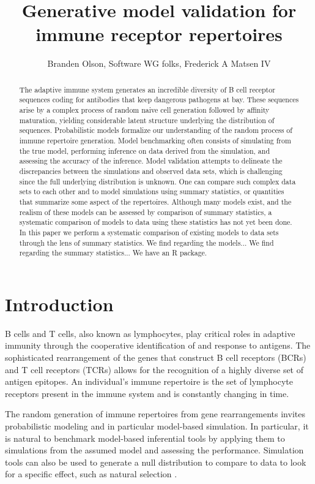 \documentclass{article}
\title{Generative model validation for immune receptor repertoires}
\author{Branden Olson, Software WG folks, Frederick A Matsen IV}
\begin{document}
\maketitle

\begin{abstract}
The adaptive immune system generates an incredible diversity of B cell receptor sequences coding for antibodies that keep dangerous pathogens at bay.
These sequences arise by a complex process of random naive cell generation followed by affinity maturation, yielding considerable latent structure underlying the distribution of sequences.
Probabilistic models formalize our understanding of the random process of immune repertoire generation.
Model benchmarking often consists of simulating from the true model, performing inference on data derived from the simulation, and assessing the accuracy of the inference.
Model validation attempts to delineate the discrepancies between the simulations and observed data sets, which is challenging since the full underlying distribution is unknown.
One can compare such complex data sets to each other and to model simulations using summary statistics, or quantities that summarize some aspect of the repertoires.
Although many models exist, and the realism of these models can be assessed by comparison of summary statistics, a systematic comparison of models to data using these statistics has not yet been done.
In this paper we perform a systematic comparison of existing models to data sets through the lens of summary statistics.
We find regarding the models...
We find regarding the summary statistics...
We have an R package.
\end{abstract}

\section*{Introduction}

B cells and T cells, also known as lymphocytes, play critical roles in adaptive immunity through the cooperative identification of and response to antigens.
The sophisticated rearrangement of the genes that construct B cell receptors (BCRs) and T cell receptors (TCRs) allows for the recognition of a highly diverse set of antigen epitopes.
An individual's immune repertoire is the set of lymphocyte receptors present in the immune system and is constantly changing in time.

The random generation of immune repertoires from gene rearrangements invites probabilistic modeling and in particular model-based simulation.
In particular, it is natural to benchmark model-based inferential tools by applying them to simulations from the assumed model and assessing the performance.
Simulation tools can also be used to generate a null distribution to compare to data to look for a specific effect, such as natural selection \cite{Yaari2012-kk}.
\end{document}
